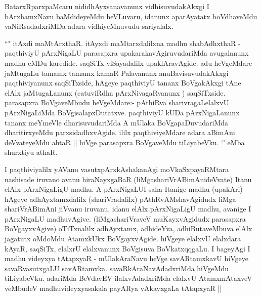 \begin{center}


\end{center}

\begin{artha}
BatarxRparxpaMcaru nididhAyxsanavanunx vidhisuvudakAkxgi I bArxhamxNavu baMdideyeMdu 
heVLuvaru, idanunx aparAyatatx boVdhaveMdu vaNiRsadadxriMDa adara vidhiyeMnuvudu
sariyalalx.
\end{artha}

\begin{artha}
``\stext" itAxdi maMtArxthaR. itAyxdi maMtarxdalilxna madhu shabAdhxthaR - paqthiviyU 
pArxNigaLU parasapxra upakarakavAgiruvudariMda avugalanunx madhu eMDu karedide. saqSiTx viSayadalilx upaklAravAgide. adu heVgeMdare - jaMtugaLu tamamx tamamx kamaR Palavanunx 
anuBavisuvudakAkxgi paqthiviyanunx saqSiTxside, hAgeye paqthiviyU tananx BoVgakAkxgi tAne 
elAlx jaMtugaLanunx (catuviRdha pArxNivagaRvanunx ) saqSiTxside. parasapxra BoVgaveMbudu 
heVgeMdare:- pAthiRva sharivragaLelalxvU pArxNigaLiMda BoVgisalapxDutatxve. paqthiviyU 
kUDa pArxNigaLanunx tananx meYmeVle dharisuvudariMda A mUlaka BoVgapaDuvudariMda 
dharitirxyeMdu parxsidadhxvAgide. ililx paqthiviyeMdare adara aBimAni deVvateyeMdu ahtaR 
|| hiVge parasapxra BoVgaveMdu tiLiyabeVku. `\stext' eMba shurxtiyu athaR. 
\end{artha}

\begin{center}


\end{center}

\begin{artha}
I paqthiviyalilx yAVanu vasutxpArxkAshakanAgi moVkaSxpayaRMtara nashisade iruvano avanu hiraNayxgaBaR (liMgashariVrABimAnideVvate) Itanu elAlx pArxNigaLigU madhu. A pArxNigaLUI saha Itanige madhu (upakAri) hAgeye adhAyxtamxdalilx (shariVradalilx) pAthRvAMshavAgidudx liMga shariVrABimAni jiVvanu iruvanu. idanu elAlx pArxNigaLigU madhu, avanige I pArxNigaLU madhuvAgive. (liMgashariVraveV muKayxvAgidudx parasapxra BoVgayxvAgive) oTiTxnalilx adhAyxtamx, adhideYva, adhiButaveMbuva elAlx jagatutx oMdoMdu AtamxkUkx BoVgayxvAgide. hiVgeye elalxvU elalxdara kAyaR, saqSiTx, elalxrU elalxvanunx BoVgisuva BoVkatxqqgaLu. I bageyAgi I madhu videyxya tAtapxyaR - mUlakAraNavu heVge savARtamxkavU hiVgeye savaRvasutxgaLU savARtamxka. savaRkAraNavAdadxriMda hiVgeMdu tiLiyabeVku. adariMda BeVdavEV ilalxvAdadxriMda elalxvU AtamxmAtaxveV veMbudeV madhuvideyxyasakala payARya vAkayxgaLa tAtapxyaR ||
\end{artha}

